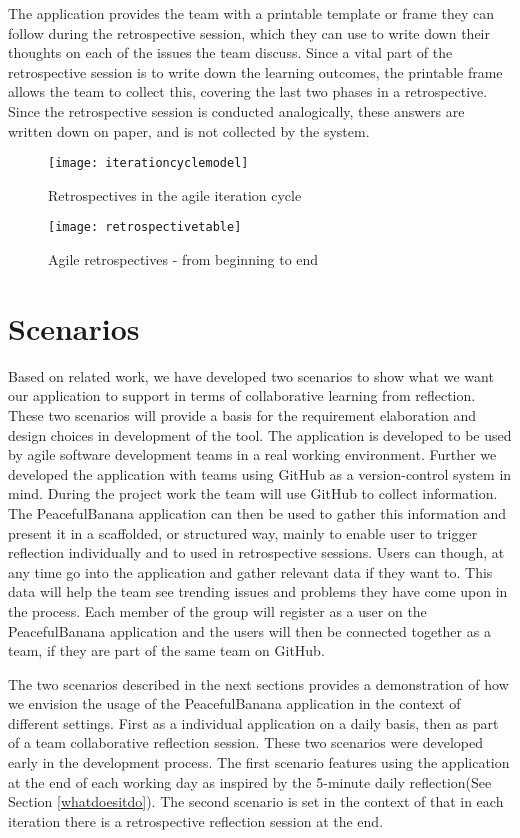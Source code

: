 The application provides the team with a printable template or frame they can follow during the retrospective session, which they can use to write down their thoughts on each of the issues the team discuss. Since a vital part of the retrospective session is to write down the learning outcomes, the printable frame allows the team to collect this, covering the last two phases in a retrospective. Since the retrospective session is conducted analogically, these answers are written down on paper, and is not collected by the system. 
\begin{figure}[H]
\centering
	\texttt{[image: iterationcyclemodel]}
\caption{Retrospectives in the agile iteration cycle \citep{Derby2006}}
\label{fig:itcyclemodel}
\end{figure}
\begin{figure}[H]
\centering
	\texttt{[image: retrospectivetable]}
\caption{Agile retrospectives - from beginning to end \citep{Derby2006}}
\label{fig:retrospectivetable}
\end{figure}

\section{Scenarios}
\label{sec:scenarios}
Based on related work, we have developed two scenarios to show what we want our application to support in terms of collaborative learning from reflection. These two scenarios will provide a basis for the requirement elaboration and design choices in development of the tool. 
The application is developed to be used by agile software development teams in a real working environment. Further we developed the application with teams using GitHub as a version-control system in mind. During the project work the team will use GitHub to collect information. The PeacefulBanana application can then be used to gather this information and present it in a scaffolded, or structured way, mainly to enable user to trigger reflection individually and to used in retrospective sessions. Users can though, at any time go into the application and gather relevant data if they want to. This data will help the team see trending issues and problems they have come upon in the process. Each member of the group will register as a user on the PeacefulBanana application and the users will then be connected together as a team, if they are part of the same team on GitHub. 

The two scenarios described in the next sections provides a demonstration of how we envision the usage of the PeacefulBanana application in the context of different settings. First as a individual application on a daily basis, then as part of a team collaborative reflection session.
These two scenarios were developed early in the development process. The first scenario features using the application at the end of each working day as inspired by the 5-minute daily reflection(See Section \ref{whatdoesitdo}). The second scenario is set in the context of that in each iteration there is a retrospective reflection session at the end. 

